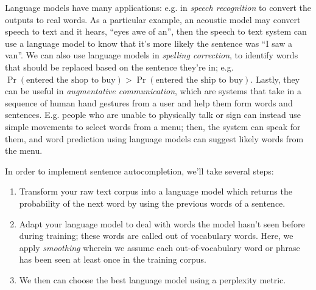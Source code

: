 \documentclass[12pt]{article}
\begin{document}
Language models have many applications: e.g. in \emph{speech recognition} to convert the outputs to real words. As a particular example, an acoustic model may convert speech to text and it hears, ``eyes awe of an'', then the speech to text system can use a language model to know that it's more likely the sentence was ``I saw a van''. We can also use language models in \emph{spelling correction}, to identify words that should be replaced based on the sentence they're in; e.g. $\Pr(\textrm{entered the shop to buy}) > \Pr(\textrm{entered the ship to buy})$. Lastly, they can be useful in \emph{augmentative communication}, which are systems that take in a sequence of human hand gestures from a user and help them form words and sentences. E.g. people who are unable to physically talk or sign can instead use simple movements to select words from a menu; then, the system can speak for them, and word prediction using language models can suggest likely words from the menu.

In order to implement sentence autocompletion, we'll take several steps:

\begin{enumerate}
\item Transform your raw text corpus into a language model which returns the   probability of the next word by using the previous words of a sentence.
\item Adapt your language model to deal with words the model hasn't seen before during training; these words are called out of vocabulary words. Here, we apply \emph{smoothing} wherein we assume each out-of-vocabulary word or phrase has been seen at least once in the training corpus.
\item We then can choose the best language model using a perplexity metric.
\end{enumerate}
\end{document}
